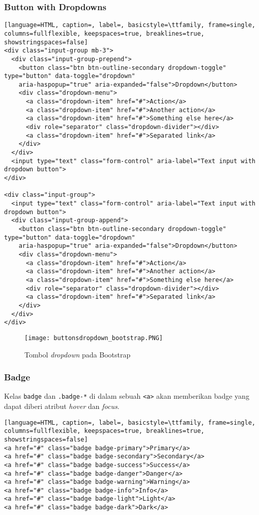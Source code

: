 \subsubsection{Button with Dropdowns}
\begin{lstlisting}[language=HTML, caption=, label=, basicstyle=\ttfamily, frame=single, columns=fullflexible, keepspaces=true, breaklines=true, showstringspaces=false] 
<div class="input-group mb-3">
  <div class="input-group-prepend">
    <button class="btn btn-outline-secondary dropdown-toggle" type="button" data-toggle="dropdown"
    aria-haspopup="true" aria-expanded="false">Dropdown</button>
    <div class="dropdown-menu">
      <a class="dropdown-item" href="#">Action</a>
      <a class="dropdown-item" href="#">Another action</a>
      <a class="dropdown-item" href="#">Something else here</a>
      <div role="separator" class="dropdown-divider"></div>
      <a class="dropdown-item" href="#">Separated link</a>
    </div>
  </div>
  <input type="text" class="form-control" aria-label="Text input with dropdown button">
</div>

<div class="input-group">
  <input type="text" class="form-control" aria-label="Text input with dropdown button">
  <div class="input-group-append">
    <button class="btn btn-outline-secondary dropdown-toggle" type="button" data-toggle="dropdown"
    aria-haspopup="true" aria-expanded="false">Dropdown</button>
    <div class="dropdown-menu">
      <a class="dropdown-item" href="#">Action</a>
      <a class="dropdown-item" href="#">Another action</a>
      <a class="dropdown-item" href="#">Something else here</a>
      <div role="separator" class="dropdown-divider"></div>
      <a class="dropdown-item" href="#">Separated link</a>
    </div>
  </div>
</div>
\end{lstlisting}

\begin{figure} [H]
	\centering  
	\texttt{[image: buttonsdropdown\_bootstrap.PNG]}  
	\caption{Tombol \textit{dropdown} pada Bootstrap} 
\end{figure}

\subsubsection{Badge}
Kelas \texttt{badge} dan \texttt{.badge-*} di dalam sebuah \texttt{<a>} akan memberikan badge yang dapat diberi atribut \textit{hover} dan \textit{focus}. 
\begin{lstlisting}[language=HTML, caption=, label=, basicstyle=\ttfamily, frame=single, columns=fullflexible, keepspaces=true, breaklines=true, showstringspaces=false] 
<a href="#" class="badge badge-primary">Primary</a>
<a href="#" class="badge badge-secondary">Secondary</a>
<a href="#" class="badge badge-success">Success</a>
<a href="#" class="badge badge-danger">Danger</a>
<a href="#" class="badge badge-warning">Warning</a>
<a href="#" class="badge badge-info">Info</a>
<a href="#" class="badge badge-light">Light</a>
<a href="#" class="badge badge-dark">Dark</a>
\end{lstlisting}

